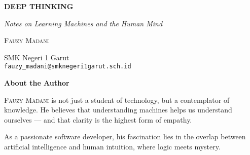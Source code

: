 \documentclass{book}
\begin{document}
\begin{titlepage}
\centering
\vspace*{3cm}
{\Huge\bfseries DEEP THINKING\par}
\vspace{0.5cm}
{\Large\itshape Notes on Learning Machines and the Human Mind\par}
\vspace{2cm}
{\LARGE\scshape Fauzy Madani\par}
\vfill
{\Large SMK Negeri 1 Garut \\ \texttt{fauzy\_madani@smknegeri1garut.sch.id}}
\vspace*{2cm}

\end{titlepage}
\clearpage

\thispagestyle{empty}
\vspace*{5cm}
\begin{center}
  {\Huge\bfseries About the Author}

  \vspace{1cm}
  \lettrine[lines=3]{F}{auzy Madani} is not just a student of technology, but a contemplator of knowledge. He believes that understanding machines helps us understand ourselves — and that clarity is the highest form of empathy.

  \vspace{0.5cm}
  As a passionate software developer, his fascination lies in the overlap between artificial intelligence and human intuition, where logic meets mystery.

  \vspace{1cm}
\end{center}
\clearpage

\tableofcontents
\clearpage

\end{document}
